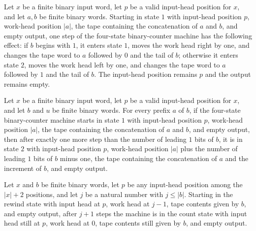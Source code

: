 \begin{lemma}
\label{Complexity.counter_carry_step}
\leanok
{}
Let $x$ be a finite binary input word, let $p$ be a valid input-head position for $x$,
and let $a,b$ be finite binary words. Starting in state $1$ with input-head position
$p$, work-head position $|a|$, the tape containing the concatenation of $a$ and $b$, and
empty output, one step of the four-state binary-counter machine has the following
effect: if $b$ begins with $1$, it enters state $1$, moves the work head right by one,
and changes the tape word to $a$ followed by $0$ and the tail of $b$; otherwise it
enters state $2$, moves the work head left by one, and changes the tape word to $a$
followed by $1$ and the tail of $b$. The input-head position remains $p$ and the output
remains empty.
\end{lemma}

\begin{lemma}
\label{Complexity.counter_carry}
\leanok
{}
Let $x$ be a finite binary input word, let $p$ be a valid input-head position for $x$,
and let $b$ and $u$ be finite binary words. For every prefix $a$ of $b$, if the
four-state binary-counter machine starts in state $1$ with input-head position $p$,
work-head position $|a|$, the tape containing the concatenation of $a$ and $b$, and
empty output, then after exactly one more step than the number of leading $1$ bits of
$b$, it is in state $2$ with input-head position $p$, work-head position $|a|$ plus the
number of leading $1$ bits of $b$ minus one, the tape containing the concatenation of
$a$ and the increment of $b$, and empty output.
\end{lemma}

\begin{lemma}
\label{Complexity.counter_rewind}
\leanok
{}
Let $x$ and $b$ be finite binary words, let $p$ be any input-head position among the
$|x|+2$ positions, and let $j$ be a natural number with $j\le |b|$. Starting in the
rewind state with input head at $p$, work head at $j-1$, tape contents given by $b$, and
empty output, after $j+1$ steps the machine is in the count state with input head still
at $p$, work head at $0$, tape contents still given by $b$, and empty output.
\end{lemma}

